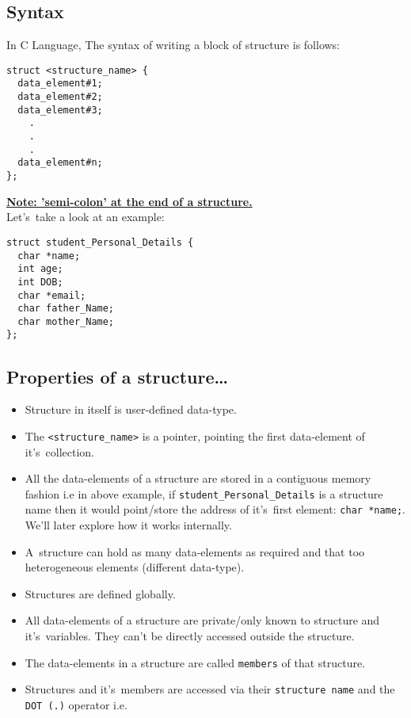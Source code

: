 \documentclass[11pt]{article}
\begin{document}
\subsection{Syntax}
\label{sec:org4ea3a70}

In C Language, The syntax of writing a block of structure is follows:

\begin{verbatim}
struct <structure_name> {
  data_element#1;
  data_element#2;
  data_element#3;
    .
    .
    .
  data_element#n;
};
\end{verbatim}

\uline{\textbf{Note: ’semi-colon’ at the end of a structure.}}\\
Let’s take a look at an example:

\begin{verbatim}
struct student_Personal_Details {
  char *name;
  int age;
  int DOB;
  char *email;
  char father_Name;
  char mother_Name;
};
\end{verbatim}

\subsection{Properties of a structure…}
\label{sec:org1f6b283}
\begin{itemize}
\item Structure in itself is user-defined data-type.
\item The \texttt{<structure\_name>} is a pointer, pointing the first data-element of
it’s collection.
\item All the data-elements of a structure are stored in a contiguous memory fashion
i.e in above example, if \texttt{student\_Personal\_Details} is a structure name then it would
point/store the address of it’s first element: \texttt{char *name;}. We’ll later
explore how it works internally.
\item A structure can hold as many data-elements as required and that too
heterogeneous elements (different data-type).
\item Structures are defined globally.
\item All data-elements of a structure are private/only known to structure and
it’s variables. They can’t be directly accessed outside the structure.
\item The data-elements in a structure are called \texttt{members} of that structure.
\item Structures and it’s members are accessed via their \texttt{structure name} and the
\texttt{DOT (.)} operator i.e.
\end{itemize}
\end{document}
